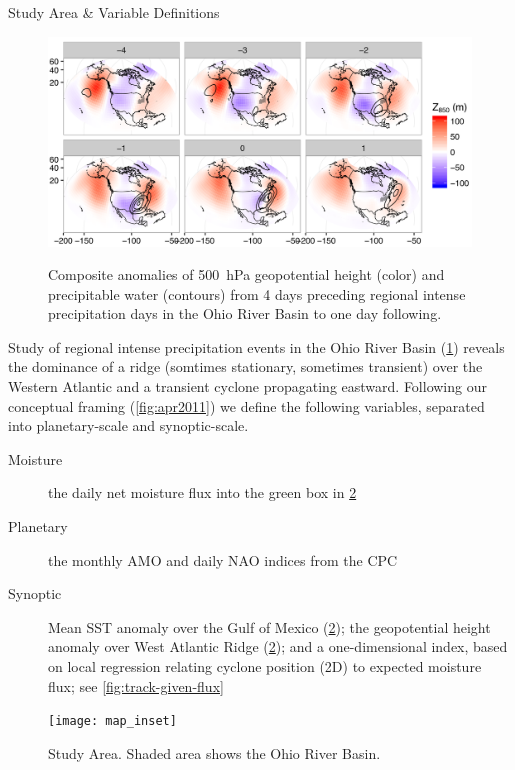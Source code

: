 \begin{block}{Study Area \& Variable Definitions}
    \begin{figure}
        \centering
        \caption{Composite anomalies of \SI{500}{\hecto\pascal} geopotential height (color) and precipitable water (contours) from 4 days preceding regional intense precipitation days in the Ohio River Basin to one day following.}
        \includegraphics[width=\columnwidth]{../FigExternal/djf_composites}
        \label{fig:djf-composites}
    \end{figure}
    Study \cite{Farnham2016} of regional intense precipitation events in the Ohio River Basin (\cref{fig:djf-composites}) reveals the dominance of a ridge (somtimes stationary, sometimes transient) over the Western Atlantic and a transient cyclone propagating eastward.
    Following our conceptual framing (\cref{fig:apr2011}) we define the following variables, separated into planetary-scale and synoptic-scale.
    \begin{description}
        \item[Moisture] the daily net moisture flux into the green box in \cref{fig:study-area}
        \item[Planetary] the monthly AMO and daily NAO indices from the CPC
         \item[Synoptic] Mean SST anomaly over the Gulf of Mexico (\cref{fig:study-area}); the geopotential height anomaly over West Atlantic Ridge (\cref{fig:study-area}); and a one-dimensional index, based on local regression \cite{Loader1999} relating cyclone position (2D) to expected moisture flux; see \cref{fig:track-given-flux}
    \end{description}
    \begin{figure}
        \centering
        \texttt{[image: map\_inset]}
        \caption{Study Area. Shaded area shows the Ohio River Basin.}
        \label{fig:study-area}
    \end{figure}
\end{block}
